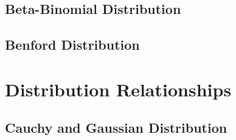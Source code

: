 \documentclass[11pt]{report} %
\begin{document}
\subsection{Beta-Binomial Distribution}

\subsection{Benford Distribution}

\section{Distribution Relationships}

\subsection{Cauchy and Gaussian Distribution}
\end{document}
